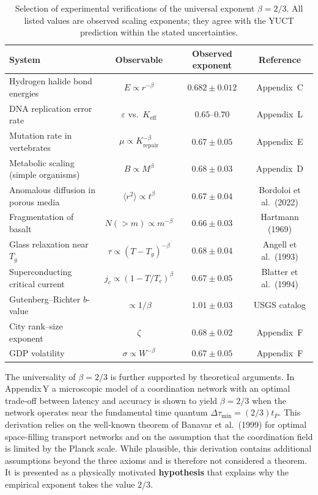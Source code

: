 \documentclass[12pt,a4paper]{article}
\begin{document}
	\begin{table}[htbp]
		\centering
		\caption{Selection of experimental verifications of the universal exponent \(\beta = 2/3\).  All listed values are observed scaling exponents; they agree with the YUCT prediction within the stated uncertainties.}
		\label{tab:beta-evidence}
		\small
		\begin{tabular}{l c c c}
			\toprule
			System & Observable & Observed exponent & Reference \\
			\midrule
			Hydrogen halide bond energies & \(E \propto r^{-\beta}\) & \(0.682 \pm 0.012\) & Appendix~C \\
			DNA replication error rate & \(\varepsilon\) vs.\ \(K_{\mathrm{eff}}\) & \(0.65\text{--}0.70\) & Appendix~L \\
			Mutation rate in vertebrates & \(\mu \propto K_{\mathrm{repair}}^{-\beta}\) & \(0.67 \pm 0.05\) & Appendix~E \\
			Metabolic scaling (simple organisms) & \(B \propto M^{\beta}\) & \(0.68 \pm 0.03\) & Appendix~D \\
			Anomalous diffusion in porous media & \(\langle r^2 \rangle \propto t^{\beta}\) & \(0.67 \pm 0.04\) & Bordoloi et al.\ (2022) \\
			Fragmentation of basalt & \(N(>m) \propto m^{-\beta}\) & \(0.66 \pm 0.03\) & Hartmann (1969) \\
			Glass relaxation near \(T_g\) & \(\tau \propto (T-T_g)^{-\beta}\) & \(0.68 \pm 0.04\) & Angell et al.\ (1993) \\
			Superconducting critical current & \(j_c \propto (1-T/T_c)^{\beta}\) & \(0.67 \pm 0.05\) & Blatter et al.\ (1994) \\
			Gutenberg–Richter \(b\)-value & \(\propto 1/\beta\) & \(1.01 \pm 0.03\) & USGS catalog \\
			City rank–size exponent & \(\zeta\) & \(0.68 \pm 0.02\) & Appendix~F \\
			GDP volatility & \(\sigma \propto W^{-\beta}\) & \(0.67 \pm 0.05\) & Appendix~F \\
			\bottomrule
		\end{tabular}
	\end{table}
	
	The universality of \(\beta = 2/3\) is further supported by theoretical arguments.  In Appendix Y a microscopic model of a coordination network with an optimal trade‑off between latency and accuracy is shown to yield \(\beta = 2/3\) when the network operates near the fundamental time quantum \(\Delta\tau_{\min} = (2/3) t_P\).  This derivation relies on the well‑known theorem of Banavar et al.\ (1999) for optimal space‑filling transport networks and on the assumption that the coordination field is limited by the Planck scale.  While plausible, this derivation contains additional assumptions beyond the three axioms and is therefore not considered a theorem.  It is presented as a physically motivated \textbf{hypothesis} that explains why the empirical exponent takes the value \(2/3\).
	
\end{document}
